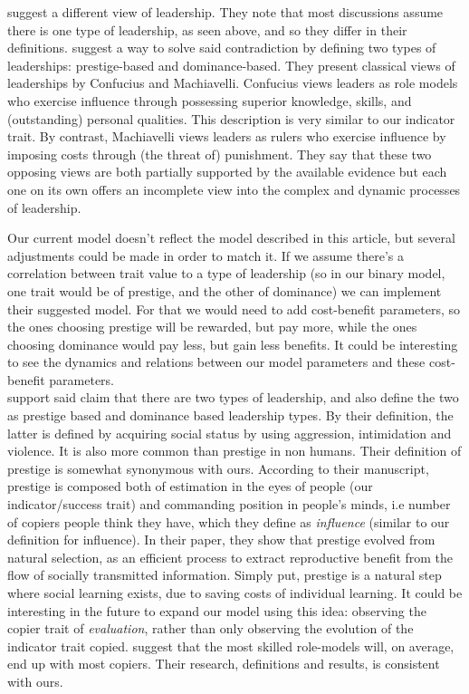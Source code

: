 \documentclass[11pt]{article}
\begin{document}
\citet{dual_leadership} suggest a different view of leadership. They note that most discussions assume there is one type of leadership, as seen above, and so they differ in their definitions. \citet{dual_leadership} suggest a way to solve said contradiction by defining two types of leaderships: prestige-based and dominance-based.
They present classical views of leaderships by Confucius and Machiavelli. Confucius views leaders as role models who exercise influence through possessing superior knowledge, skills,
and (outstanding) personal qualities. This description is very similar to our indicator trait. By contrast, Machiavelli views leaders as rulers who exercise influence by imposing costs through (the threat of) punishment. They say that these two opposing views are both partially supported by the available evidence but each one on its own offers an incomplete view into the complex and dynamic processes of leadership. 

Our current model doesn't reflect the model described in this article, but several adjustments could be made in order to match it. If we assume there's a correlation between trait value to a type of leadership (so in our binary model, one trait would be of prestige, and the other of dominance) we can implement their suggested model. For that we would need to add cost-benefit parameters, so the ones choosing prestige will be rewarded, but pay more, while the ones choosing dominance would pay less, but gain less benefits. It could be interesting to see the dynamics and relations between our model parameters and these cost-benefit parameters.\\

\citet{prestige_evolution} support said claim that there are two types of leadership, and also define the two as prestige based and dominance based leadership types.
By their definition, the latter is defined by acquiring social status by using aggression, intimidation and violence. It is also more common than prestige in non humans. Their definition of prestige is somewhat synonymous with ours. According to their manuscript, prestige is composed both of estimation in the eyes of people (our indicator/success trait) and commanding position in people's minds, i.e number of copiers people think they have, which they define as \textit{influence} (similar to our definition for influence).
In their paper, they show that prestige evolved from natural selection, as an efficient process to extract reproductive benefit from the flow of socially transmitted information. Simply put, prestige is a natural step where social learning exists, due to saving costs of individual learning.
It could be interesting in the future to expand our model using this idea: observing the copier trait of \textit{evaluation}, rather than only observing the evolution of the indicator trait copied.
\citet{prestige_evolution} suggest that the most skilled role-models will, on average, end up with most copiers. Their research, definitions and results, is consistent with ours.\\
\end{document}
